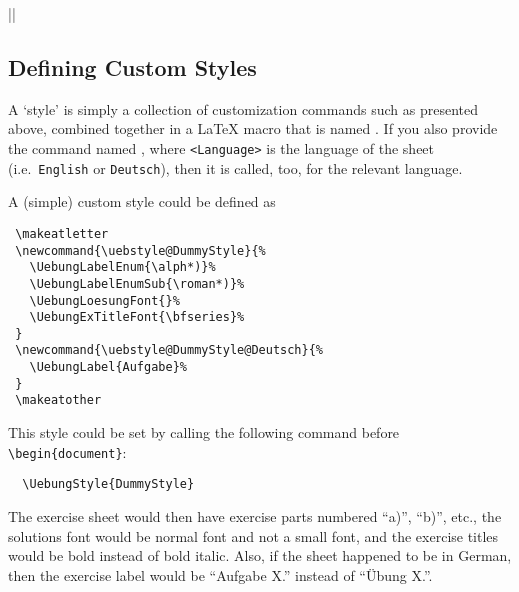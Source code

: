 \documentclass[11pt,a4paper]{article}
\begin{document}
\verbdef\verbUniZHLogoWidth|\UniZHLogo[3cm]|

\subsection{Defining Custom Styles}
\label{sec:customstyles}

A `style' is simply a collection of customization commands such as presented above,
combined together in a \LaTeX{} macro that is named
. If you also provide the command named
, where \texttt{<Language>} is the
language of the sheet (i.e.\ \texttt{English} or \texttt{Deutsch}), then it is called,
too, for the relevant language.

A (simple) custom style could be defined as
\begin{pkgverbatim}
\begin{verbatim}
 \makeatletter
 \newcommand{\uebstyle@DummyStyle}{%
   \UebungLabelEnum{\alph*)}%
   \UebungLabelEnumSub{\roman*)}%
   \UebungLoesungFont{}%
   \UebungExTitleFont{\bfseries}%
 }
 \newcommand{\uebstyle@DummyStyle@Deutsch}{%
   \UebungLabel{Aufgabe}%
 }
 \makeatother
\end{verbatim}
\end{pkgverbatim}

This style could be set by calling the following command before \verb|\begin{document}|:
\begin{pkgverbatim}
\begin{verbatim}
  \UebungStyle{DummyStyle}
\end{verbatim}
\end{pkgverbatim}

The exercise sheet would then have exercise parts numbered ``a)'', ``b)'', etc., the
solutions font would be normal font and not a small font, and the exercise titles would be
bold instead of bold italic. Also, if the sheet happened to be in German, then the
exercise label would be ``Aufgabe X.'' instead of ``\"Ubung X.''.
\end{document}
